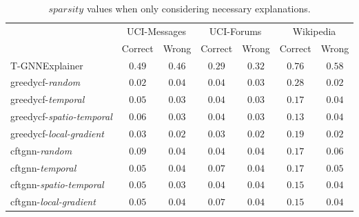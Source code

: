 \begin{table}[ht]
    \centering
    \small
    \begin{tabular}{lcccccc}
    \hline
         &  \multicolumn{2}{c}{UCI-Messages}&  \multicolumn{2}{c}{UCI-Forums}&  \multicolumn{2}{c}{Wikipedia}\\
         &  Correct&  Wrong&  Correct&  Wrong&  Correct& Wrong\\
         \hline
         T-GNNExplainer&  $0.49$&  $0.46$&  $0.29$&  $0.32$&  $0.76$& $0.58$\\
         \gls{greedycf}-\textit{random}&  $0.02$&  $0.04$&  $0.04$&  $0.03$&  $0.28$& $0.02$\\
         \gls{greedycf}-\textit{temporal}&  $0.05$&  $0.03$&  $0.04$&  $0.03$&  $0.17$& $0.04$\\
         \gls{greedycf}-\textit{spatio-temporal}&  $0.06$&  $0.03$&  $0.04$&  $0.03$&  $0.13$& $0.04$\\
         \gls{greedycf}-\textit{local-gradient}&  $0.03$&  $0.02$&  $0.03$&  $0.02$&  $0.19$& $0.02$\\
         \gls{cftgnn}-\textit{random}&  $0.09$&  $0.04$&  $0.04$&  $0.04$&  $0.17$& $0.06$\\
         \gls{cftgnn}-\textit{temporal}&  $0.05$&  $0.04$&  $0.07$&  $0.04$&  $0.17$& $0.05$\\
         \gls{cftgnn}-\textit{spatio-temporal}&  $0.05$&  $0.03$&  $0.04$&  $0.04$&  $0.15$& $0.04$\\
 \gls{cftgnn}-\textit{local-gradient}& $0.05$& $0.04$& $0.07$& $0.04$& $0.15$&$0.04$\\
 \hline
    \end{tabular}
    \caption{$sparsity$ values when only considering necessary explanations.}
    \label{t_spar_nec}
\end{table}


